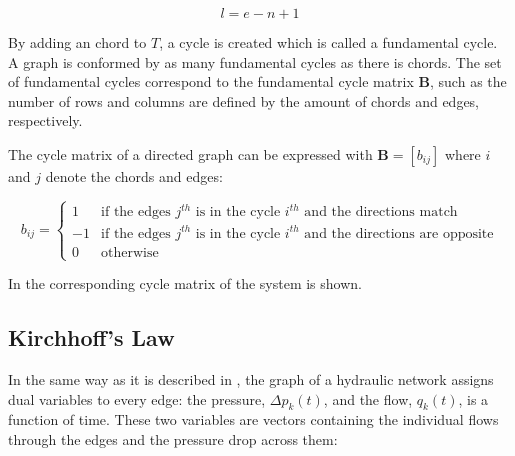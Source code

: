 \begin{equation}
  \label{Numberofchords}
  l = e - n +1
\end{equation}

By adding an chord to $T$, a cycle is created which is called a fundamental cycle. A graph is conformed by as many fundamental cycles as there is chords\cite{GraphModel}.  
The set of fundamental cycles correspond to the fundamental cycle matrix $\bm{B}$, such as the number of rows and columns are defined by the amount of chords and edges, respectively. 

The cycle matrix of a directed graph can be expressed with $\bm{B} = [b_{ij}]$ where $i$ and $j$ denote the chords and edges:

\begin{equation}
\label{DiGraphCycle}
 b_{ij} =
		\left\{
		\begin{array}{ll}
		
		1 			&      \text{if the edges $j^{th}$ is in the cycle $i^{th}$ and the directions match}	
\\
		-1                       &     \text{if the edges $j^{th}$ is in the cycle $i^{th}$ and the directions are opposite}
\\

                0                       &      \text{otherwise}

		\end{array}
		\right.
\end{equation}	

In  the corresponding cycle matrix of the system is 
shown.

\subsection*{Kirchhoff's Law}
\label{KirchhoffSection}

In the same way as it is described in , the graph of a hydraulic network assigns dual variables to every edge: 
the pressure, $\Delta p_k(t)$, and the flow, $q_k(t)$, is a function of time. These two variables are vectors containing the individual flows through the edges and 
the pressure drop across them:


